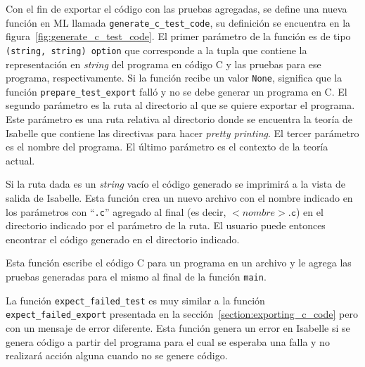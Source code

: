 Con el fin de exportar el código con las pruebas agregadas, se define una nueva función en ML llamada \verb|generate_c_test_code|, su definición se encuentra en la figura~\ref{fig:generate_c_test_code}.
El primer parámetro de la función es de tipo \verb|(string, string) option| que corresponde a la tupla que contiene la representación en \textit{string} del programa en código C y las pruebas para ese programa, respectivamente.
Si la función recibe un valor \verb|None|, significa que la función \verb|prepare_test_export| falló y no se debe generar un programa en C.
El segundo parámetro es la ruta al directorio al que se quiere exportar el programa.
Este parámetro es una ruta relativa al directorio donde se encuentra la teoría de Isabelle que contiene las directivas para hacer \textit{pretty printing}.
El tercer parámetro es el nombre del programa.
El último parámetro es el contexto de la teoría actual.

Si la ruta dada es un \textit{string} vacío el código generado se imprimirá a la vista de salida de Isabelle.
Esta función crea un nuevo archivo con el nombre indicado en los parámetros con ``\verb|.c|'' agregado al final (es decir, $<nombre>\mathtt{.c}$) en el directorio indicado por el parámetro de la ruta.
El usuario puede entonces encontrar el código generado en el directorio indicado.

Esta función escribe el código C para un programa en un archivo y le agrega las pruebas generadas para el mismo al final de la función \verb|main|.

La función \verb|expect_failed_test| es muy similar a la función \verb|expect_failed_export| presentada en la sección~\ref{section:exporting_c_code} pero con un mensaje de error diferente.
Esta función genera un error en Isabelle si se genera código a partir del programa para el cual se esperaba una falla y no realizará acción alguna cuando no se genere código.

